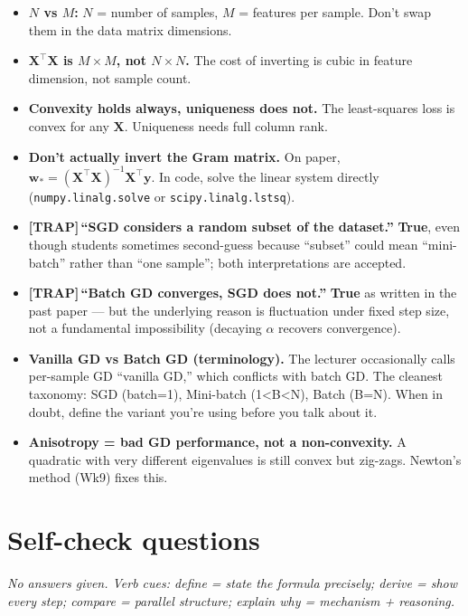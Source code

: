 \documentclass[11pt, a4paper]{article}
\newcommand{\trapflag}{\textcolor{trapBd}{\textbf{[TRAP]}}\,}
\begin{document}
\begin{itemize}
  \item \textbf{$N$ vs $M$:} $N$ = number of samples, $M$ = features per sample. Don't swap them in the data matrix dimensions.
  \item \textbf{$\mathbf{X}^\top\mathbf{X}$ is $M\times M$, not $N\times N$.} The cost of inverting is cubic in feature dimension, not sample count.
  \item \textbf{Convexity holds always, uniqueness does not.} The least-squares loss is convex for any $\mathbf{X}$. Uniqueness needs full column rank.
  \item \textbf{Don't actually invert the Gram matrix.} On paper, $\mathbf{w}_* = (\mathbf{X}^\top\mathbf{X})^{-1}\mathbf{X}^\top\mathbf{y}$. In code, solve the linear system directly (\texttt{numpy.linalg.solve} or \texttt{scipy.linalg.lstsq}).
  \item \trapflag{}\textbf{``SGD considers a random subset of the dataset.''} \textbf{True}, even though students sometimes second-guess because ``subset'' could mean ``mini-batch'' rather than ``one sample''; both interpretations are accepted.
  \item \trapflag{}\textbf{``Batch GD converges, SGD does not.''} \textbf{True} as written in the past paper — but the underlying reason is fluctuation under fixed step size, not a fundamental impossibility (decaying $\alpha$ recovers convergence).
  \item \textbf{Vanilla GD vs Batch GD (terminology).} The lecturer occasionally calls per-sample GD ``vanilla GD,'' which conflicts with batch GD. The cleanest taxonomy: SGD (batch=1), Mini-batch (1<B<N), Batch (B=N). When in doubt, define the variant you're using before you talk about it.
  \item \textbf{Anisotropy = bad GD performance, not a non-convexity.} A quadratic with very different eigenvalues is still convex but zig-zags. Newton's method (Wk9) fixes this.
\end{itemize}

\section*{Self-check questions}

\textit{No answers given. Verb cues: \emph{define} = state the formula precisely; \emph{derive} = show every step; \emph{compare} = parallel structure; \emph{explain why} = mechanism + reasoning.}
\end{document}
